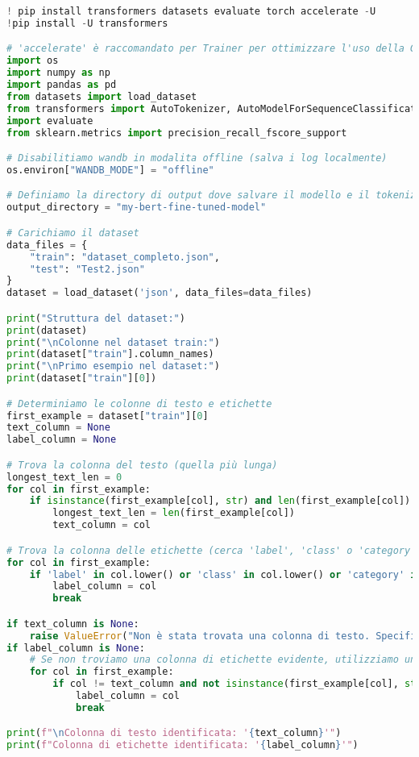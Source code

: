 \documentclass[11pt,a4paper]{article}
\begin{document}
\begin{lstlisting}[caption={Codice di Training per il Fine Tuning di BERT}, language=Python]
! pip install transformers datasets evaluate torch accelerate -U
!pip install -U transformers

# 'accelerate' è raccomandato per Trainer per ottimizzare l'uso della GPU/TPU
import os
import numpy as np
import pandas as pd
from datasets import load_dataset
from transformers import AutoTokenizer, AutoModelForSequenceClassification, TrainingArguments, Trainer, TrainerCallback
import evaluate
from sklearn.metrics import precision_recall_fscore_support

# Disabilitiamo wandb in modalita offline (salva i log localmente)
os.environ["WANDB_MODE"] = "offline"

# Definiamo la directory di output dove salvare il modello e il tokenizer
output_directory = "my-bert-fine-tuned-model"

# Carichiamo il dataset
data_files = {
    "train": "dataset_completo.json",
    "test": "Test2.json"
}
dataset = load_dataset('json', data_files=data_files)

print("Struttura del dataset:")
print(dataset)
print("\nColonne nel dataset train:")
print(dataset["train"].column_names)
print("\nPrimo esempio nel dataset:")
print(dataset["train"][0])

# Determiniamo le colonne di testo e etichette
first_example = dataset["train"][0]
text_column = None
label_column = None

# Trova la colonna del testo (quella più lunga)
longest_text_len = 0
for col in first_example:
    if isinstance(first_example[col], str) and len(first_example[col]) > longest_text_len:
        longest_text_len = len(first_example[col])
        text_column = col

# Trova la colonna delle etichette (cerca 'label', 'class' o 'category')
for col in first_example:
    if 'label' in col.lower() or 'class' in col.lower() or 'category' in col.lower():
        label_column = col
        break

if text_column is None:
    raise ValueError("Non è stata trovata una colonna di testo. Specifica manualmente il nome della colonna.")
if label_column is None:
    # Se non troviamo una colonna di etichette evidente, utilizziamo una colonna non di testo
    for col in first_example:
        if col != text_column and not isinstance(first_example[col], str):
            label_column = col
            break

print(f"\nColonna di testo identificata: '{text_column}'")
print(f"Colonna di etichette identificata: '{label_column}'")


\end{lstlisting}
\end{document}
